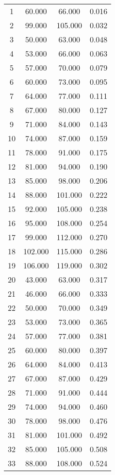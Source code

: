 % 
\begin{tabular}{cccc}
  \hline
  \hline
1 & 60.000 & 66.000 & 0.016 \\ 
  2 & 99.000 & 105.000 & 0.032 \\ 
  3 & 50.000 & 63.000 & 0.048 \\ 
  4 & 53.000 & 66.000 & 0.063 \\ 
  5 & 57.000 & 70.000 & 0.079 \\ 
  6 & 60.000 & 73.000 & 0.095 \\ 
  7 & 64.000 & 77.000 & 0.111 \\ 
  8 & 67.000 & 80.000 & 0.127 \\ 
  9 & 71.000 & 84.000 & 0.143 \\ 
  10 & 74.000 & 87.000 & 0.159 \\ 
  11 & 78.000 & 91.000 & 0.175 \\ 
  12 & 81.000 & 94.000 & 0.190 \\ 
  13 & 85.000 & 98.000 & 0.206 \\ 
  14 & 88.000 & 101.000 & 0.222 \\ 
  15 & 92.000 & 105.000 & 0.238 \\ 
  16 & 95.000 & 108.000 & 0.254 \\ 
  17 & 99.000 & 112.000 & 0.270 \\ 
  18 & 102.000 & 115.000 & 0.286 \\ 
  19 & 106.000 & 119.000 & 0.302 \\ 
  20 & 43.000 & 63.000 & 0.317 \\ 
  21 & 46.000 & 66.000 & 0.333 \\ 
  22 & 50.000 & 70.000 & 0.349 \\ 
  23 & 53.000 & 73.000 & 0.365 \\ 
  24 & 57.000 & 77.000 & 0.381 \\ 
  25 & 60.000 & 80.000 & 0.397 \\ 
  26 & 64.000 & 84.000 & 0.413 \\ 
  27 & 67.000 & 87.000 & 0.429 \\ 
  28 & 71.000 & 91.000 & 0.444 \\ 
  29 & 74.000 & 94.000 & 0.460 \\ 
  30 & 78.000 & 98.000 & 0.476 \\ 
  31 & 81.000 & 101.000 & 0.492 \\ 
  32 & 85.000 & 105.000 & 0.508 \\ 
  33 & 88.000 & 108.000 & 0.524 \\ 

\end{tabular}
